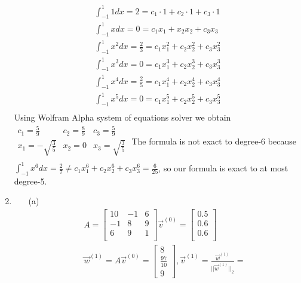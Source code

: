 \documentclass[12pt]{article}
\begin{document}
\begin{enumerate}[label=\bfseries Problem \arabic*:]
    \begin{align*}
        \int_{-1}^{1}1dx=2=c_1\cdot1+c_2\cdot1+c_3\cdot1\\
        \int_{-1}^{1}xdx=0=c_1x_1+x_2x_2+c_3x_3\\
        \int_{-1}^{1}x^2dx=\frac{2}{3}=c_1x^2_1+c_2x^2_2+c_3x^2_3\\
        \int_{-1}^{1}x^3dx=0=c_1x^3_1+c_2x^3_2+c_3x^3_3\\
        \int_{-1}^{1}x^4dx=\frac{2}{5}=c_1x^4_1+c_2x^4_2+c_3x^4_3\\
        \int_{-1}^{1}x^5dx=0=c_1x^5_1+c_2x^5_2+c_3x^5_3\\
    \end{align*}
    Using Wolfram Alpha system of equations solver we obtain
    $\begin{matrix}
        c_1=\frac{5}{9} & c_2=\frac{8}{9} & c_3=\frac{5}{9}\\
        x_1=-\sqrt{\frac{3}{5}} & x_2=0 & x_3=\sqrt{\frac{3}{5}}\\
    \end{matrix}$
    The formula is not exact to degree-6 because $\int_{-1}^{1}x^6dx=\frac{2}{7}\neq c_1x^6_1+c_2x^6_2+c_3x^6_3=\frac{6}{25}$, so our formula is exact to at most degree-5.\\
    \newpage
    \item \begin{itemize}
        \item [(a)] \begin{align*}
        A=\begin{bmatrix}
            10 & -1 & 6\\
            -1 & 8 & 9\\
            6 & 9 & 1\\
        \end{bmatrix}
        \vec{v}^{(0)}=\begin{bmatrix}
            0.5\\
            0.6\\
            0.6\\
        \end{bmatrix}\\
        \vec{w}^{(1)}=A\vec{v}^{(0)}=
        \begin{bmatrix}
            8\\
            \frac{97}{10}\\
            9
        \end{bmatrix}
        ,\vec{v}^{(1)}=\frac{\vec{w}^{(1)}}{||\vec{w}^{(1)}||_2}=

\end{align*}
\end{itemize}
\end{enumerate}
\end{document}
